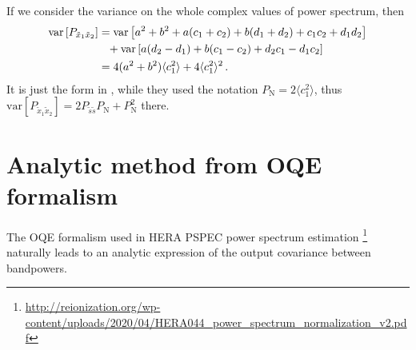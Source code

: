 \documentclass[12pt,a4paper]{article}
\begin{document}
If we consider the variance on the whole complex values of power spectrum, then 
\begin{align}
\label{eq:var_ps}
\text{var} \left[P_{\tilde{x}_1\tilde{x}_2} \right] &= \text{var} \left[a^2+b^2 + a(c_1+c_2) + b(d_1+d_2) + c_1c_2 + d_1d_2 \right] \notag \\
&\phantom{=} +  \text{var} \left[a(d_2-d_1)+b(c_1-c_2)+d_2 c_1-d_1 c_2 \right] \notag \\
& = 4(a^2+b^2)\langle c_1^2\rangle + 4\langle c_1^2\rangle^2 \,.
\end{align}
It is just the form in \citet{kolopanis2019simplified}, while they used the notation $P_\text{N} = 2\langle c_1^2\rangle$, thus $\text{var} \left[P_{\tilde{x}_1\tilde{x}_2} \right] = 2 P_{\tilde{s}\tilde{s}} P_\text{N} + P_\text{N}^2$ there. 

\section{Analytic method from OQE formalism}
\label{ap:analytic}
The OQE formalism used in HERA PSPEC power spectrum estimation \footnote{\url{http://reionization.org/wp-content/uploads/2020/04/HERA044_power_spectrum_normalization_v2.pdf}} naturally leads to an analytic expression of the output covariance between bandpowers. 
\end{document}
